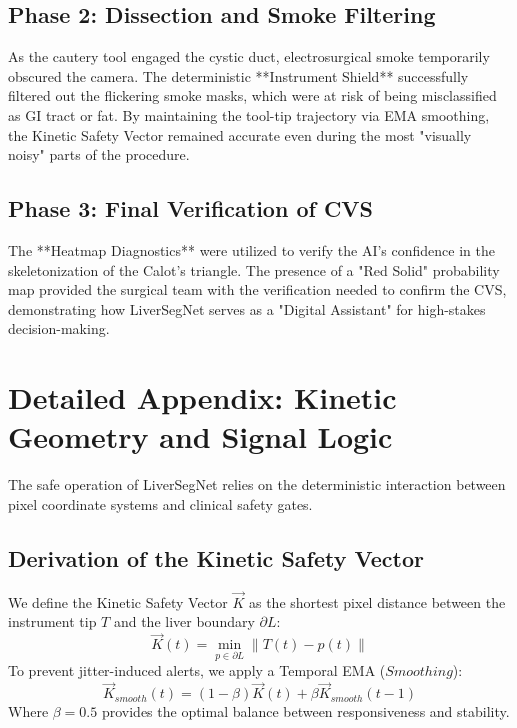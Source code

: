 \documentclass[conference]{IEEEtran}
\begin{document}
\subsection{Phase 2: Dissection and Smoke Filtering}
As the cautery tool engaged the cystic duct, electrosurgical smoke temporarily obscured the camera. The deterministic **Instrument Shield** successfully filtered out the flickering smoke masks, which were at risk of being misclassified as GI tract or fat. By maintaining the tool-tip trajectory via EMA smoothing, the Kinetic Safety Vector remained accurate even during the most "visually noisy" parts of the procedure.

\subsection{Phase 3: Final Verification of CVS}
The **Heatmap Diagnostics** were utilized to verify the AI's confidence in the skeletonization of the Calot's triangle. The presence of a "Red Solid" probability map provided the surgical team with the verification needed to confirm the CVS, demonstrating how LiverSegNet serves as a "Digital Assistant" for high-stakes decision-making.

\section{Detailed Appendix: Kinetic Geometry and Signal Logic}
The safe operation of LiverSegNet relies on the deterministic interaction between pixel coordinate systems and clinical safety gates.

\subsection{Derivation of the Kinetic Safety Vector}
We define the Kinetic Safety Vector $\vec{K}$ as the shortest pixel distance between the instrument tip $T$ and the liver boundary $\partial L$:
\begin{equation}
\vec{K}(t) = \min_{p \in \partial L} \| T(t) - p(t) \|
\end{equation}
To prevent jitter-induced alerts, we apply a Temporal EMA ($Smoothing$):
\begin{equation}
\vec{K}_{smooth}(t) = (1-\beta) \vec{K}(t) + \beta \vec{K}_{smooth}(t-1)
\end{equation}
Where $\beta=0.5$ provides the optimal balance between responsiveness and stability.
\end{document}

